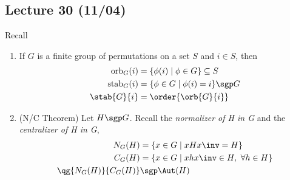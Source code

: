 \subsection*{Lecture 30 (11/04)} %

Recall
\begin{enumerate}
    \item If \(G\) is a finite group of permutations on a set \(S\) and \(i\in S\), then \begin{align*}
        \text{orb}_G(i) &= \{\phi(i)\mid\phi\in G\} \subseteq S\\
        \text{stab}_G(i) &= \{\phi\in G\mid\phi(i) = i\} \sgp G \\
        \index{G}{\stab{G}{i}} &= \order{\orb{G}{i}}
    \end{align*}
    \item (N/C Theorem) Let \(H\sgp G\). Recall the \emph{normalizer of H in G} and the \emph{centralizer of H in G}, \begin{align*}
        N_G(H)&=\{x\in G \mid xHx\inv=H\} \\
        C_G(H)&=\{x\in G \mid xhx\inv \in H,\ \forall h\in H\} \\
        \qg{N_G(H)}{C_G(H)}&\sgp \Aut(H)
    \end{align*}
\end{enumerate}


